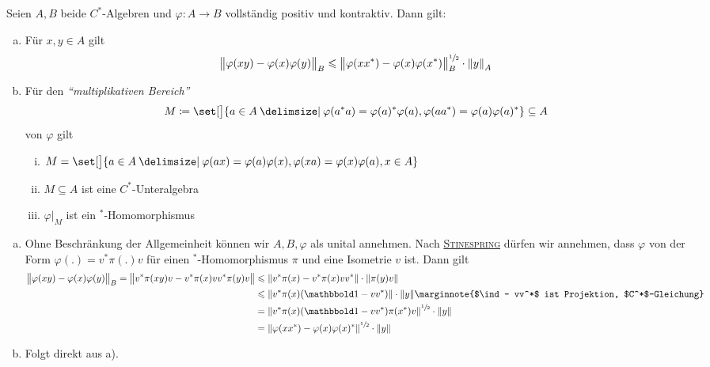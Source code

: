 \begin{lemma}
	Seien $A,B$ beide $C^*$-Algebren und $\varphi \colon A \to B$ vollständig positiv und kontraktiv.
	Dann gilt:
	\begin{enumerate}[a)]
		\item Für $x,y \in A$ gilt
		\[
			\norm[\big]{\varphi(xy) -\varphi(x) \varphi(y)}_B \le \norm[\big]{\varphi(xx^*) -\varphi(x) \varphi(x^*)}_B^{\sfrac{1}{2}} \cdot \norm*{y}_A
		\]
		\item Für den \emph{\enquote{multiplikativen Bereich}} 
		\[
			M \coloneqq \set[\big]{a \in A \given \varphi(a^*a) = \varphi(a)^* \varphi(a), \varphi(aa^*)= \varphi(a)\varphi(a)^*} \subseteq A
		\]
		von $\varphi$ gilt
		\begin{enumerate}[i)]
			\item $M= \set[\big]{a \in A \given \varphi(ax)=\varphi(a)\varphi(x), \varphi(xa)=\varphi(x) \varphi(a) , x \in A}$
			\item $M \subseteq A$ ist eine $C^*$-Unteralgebra
			\item $\varphi\big|_M$ ist ein $^*$-Homomorphismus
		\end{enumerate}
	\end{enumerate}
\end{lemma}
\begin{beweis}
	\begin{enumerate}[a)]
		\item Ohne Beschränkung der Allgemeinheit können wir $A,B,\varphi$ als unital annehmen.
		Nach \hyperref[satz:319]{\textsc{Stinespring}} dürfen wir annehmen, dass $\varphi$ von der Form $\varphi(.) = v^* \pi(.)v$ für einen $^*$-Homomorphismus $\pi$ und eine Isometrie $v$ ist.
		Dann gilt
		\begin{align}
			\norm[\big]{\varphi(xy) -\varphi(x) \varphi(y)}_B = \norm[\big]{v^*\pi(xy)v - v^*\pi(x)vv^*\pi(y)v} &\le \norm*{v^* \pi(x) - v^*\pi(x)vv^*} \cdot \norm*{\pi(y)v} \\
			&\le \norm*{v^* \pi(x)(\ind -vv^*)} \cdot \norm*{y} \marginnote{$\ind- vv^*$ ist Projektion, $C^*$-Gleichung} \\
			&= \norm*{v^* \pi(x) (\ind -vv^*) \pi(x^*) v}^{\sfrac{1}{2}} \cdot \norm*{y} \\
			&= \norm*{\varphi(xx^*) - \varphi(x)\varphi(x)^*}^{\sfrac{1}{2}} \cdot \norm*{y}
		\end{align}
		\item Folgt direkt aus a). \qedhere
	\end{enumerate}
\end{beweis}
\newpage
{}

